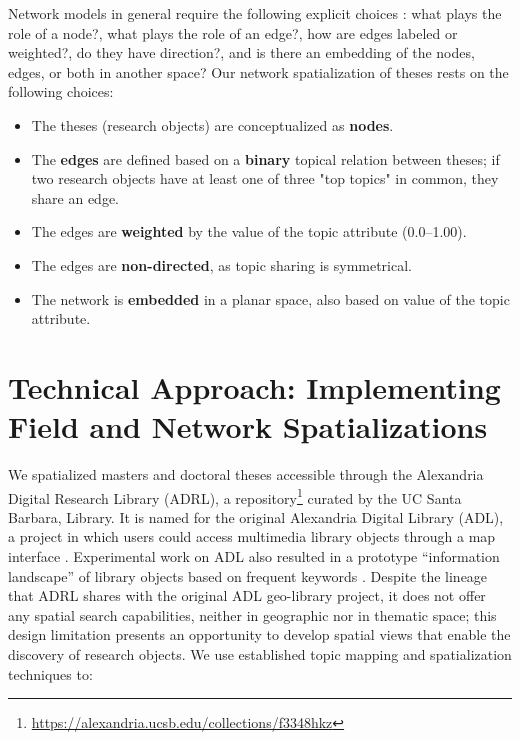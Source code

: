 \documentclass[a4paper,UKenglish]{lipics-v2018}
\begin{document}
Network models in general require the following explicit choices \cite{Newman2018a}: what plays the role of a node?, what plays the role of an edge?, how are edges labeled or weighted?, do they have direction?, and is there an embedding of the nodes, edges, or both in another space? 
Our network spatialization of theses rests on the following choices:


\begin{itemize}
    \item The theses (research objects) are conceptualized as \textbf{nodes}. 
    \item The \textbf{edges} are defined based on a \textbf{binary} topical relation between theses; if two research objects have at least one of three "top topics" in common, they share an edge. 
    \item The edges are \textbf{weighted} by the value of the topic attribute (0.0--1.00).
    \item The edges are \textbf{non-directed}, as topic sharing is symmetrical.
    \item The network is \textbf{embedded} in a planar space, also based on value of the topic attribute. 
\end{itemize}

\section{Technical Approach: Implementing Field and Network Spatializations} %
We spatialized masters and doctoral theses accessible through the Alexandria Digital Research Library (ADRL), a repository\footnote{\url{https://alexandria.ucsb.edu/collections/f3348hkz}} curated by the UC Santa Barbara, Library. It is named for the original Alexandria Digital Library (ADL), a project in which users could access multimedia library objects through a map interface \cite{Smith1995a}. Experimental work on ADL also resulted in a prototype “information landscape” of library objects based on frequent keywords \cite{Fabrikant2000b}. Despite the lineage that ADRL shares with the original ADL geo-library project, it does not offer any spatial search capabilities, neither in geographic nor in thematic space; this design limitation presents an opportunity to develop spatial views that enable the discovery of research objects. We use established topic mapping and spatialization techniques \cite{Skupin2003} to:
\end{document}
